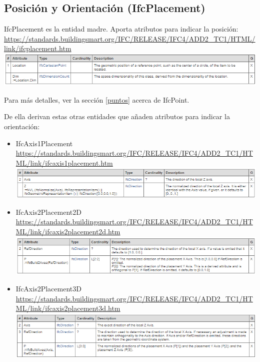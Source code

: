 \documentclass[spanish,12pt,a4paper,final,oneside]{book}
\begin{document}
\begin{itemize}
\end{itemize}

\subsection{Posición y Orientación (IfcPlacement)}\label{posicion_y_orientacion}

IfcPlacement es la entidad madre. Aporta atributos para indicar la posición:
\\ \url{https://standards.buildingsmart.org/IFC/RELEASE/IFC4/ADD2_TC1/HTML/link/ifcplacement.htm}
\\ \includegraphics[width=\textwidth]{atributos de IfcPlacement}
\\ \begin{footnotesize}Para más detalles, ver la sección \ref{puntos} acerca de IfcPoint.\end{footnotesize}

De ella derivan estas otras entidades que añaden atributos para indicar la orientación:
\begin{itemize}

\item IfcAxis1Placement
\\ \url{https://standards.buildingsmart.org/IFC/RELEASE/IFC4/ADD2_TC1/HTML/link/ifcaxis1placement.htm}
\\ \includegraphics[width=\textwidth]{atributos de IfcAxis1Placement}

\item IfcAxis2Placement2D
\\ \url{https://standards.buildingsmart.org/IFC/RELEASE/IFC4/ADD2_TC1/HTML/link/ifcaxis2placement2d.htm}
\\ \includegraphics[width=\textwidth]{atributos de IfcAxis2Placement2D}

\item IfcAxis2Placement3D
\\ \url{https://standards.buildingsmart.org/IFC/RELEASE/IFC4/ADD2_TC1/HTML/link/ifcaxis2placement3d.htm}
\\ \includegraphics[width=\textwidth]{atributos de IfcAxis2Placement3D}

\end{itemize}
\end{document}

